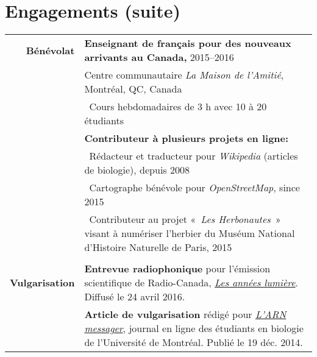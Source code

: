 \documentclass[letterpaper,10pt]{article}
\begin{document}
\section*{Engagements \small{(suite)}}
\begin{tabular}{r|p{13.5cm}}

\textbf{Bénévolat}

 & \textbf{Enseignant de français pour des nouveaux arrivants au Canada,} 2015--2016 \\
 & Centre communautaire \emph{La Maison de l’Amitié}, Montréal, QC, Canada \\
 & \textbullet{}~Cours hebdomadaires de 3 h avec 10 à 20 étudiants
   \vspace{2mm} \\

 & \textbf{Contributeur à plusieurs projets en ligne:} \\
 & \textbullet{}~Rédacteur et traducteur pour \emph{Wikipedia}
   (articles de biologie), depuis 2008 \\
 & \textbullet{}~Cartographe bénévole pour \emph{OpenStreetMap},
   since 2015 \\
 & \textbullet{}~Contributeur au projet «~\emph{Les Herbonautes}~» visant à numériser l’herbier du Muséum National d’Histoire Naturelle de Paris, 2015 \\

\multicolumn{2}{c}{} \\

\textbf{Vulgarisation}

& \textbf{Entrevue radiophonique} pour l’émission scientifique de Radio-Canada,
  \href{http://ici.radio-canada.ca/emissions/les_annees_lumiere/2009-2010/chronique.asp?idChronique=404672}{\emph{Les années lumière}}.
  Diffusé le 24 avril 2016.
  \vspace{2mm} \\

& \textbf{Article de vulgarisation} rédigé pour
  \href{http://arnmessager.com/2014/12/19/les-mots-damour-des-plantes-a-fleurs/}
  {\emph{L'ARN messager}}, journal en ligne des étudiants en biologie de l’Université de Montréal. Publié le 19 déc. 2014. \\

\end{tabular}

\bigskip
\bigskip


\end{document}
